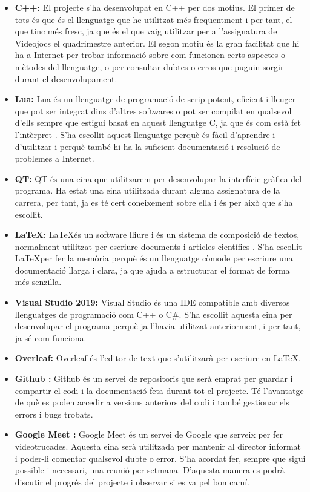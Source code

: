 \documentclass[a4paper]{article}
\begin{document}
\begin{itemize}
    \item \textbf{C++:} El projecte s'ha desenvolupat en C++ per dos motius. El primer de tots és que és el llenguatge que he utilitzat més freqüentment i per tant, el que tinc més fresc, ja que és el que vaig utilitzar per a l'assignatura de Videojocs el quadrimestre anterior. El segon motiu és la gran facilitat que hi ha a Internet per trobar informació sobre com funcionen certs aspectes o mètodes del llenguatge, o per consultar dubtes o erros que puguin sorgir durant el desenvolupament. 
    \item \textbf{Lua:} Lua és un llenguatge de programació de scrip potent, eficient i lleuger que pot ser integrat dins d'altres softwares o pot ser compilat en qualsevol d'ells sempre que estigui basat en aquest llenguatge C, ja que és com està fet l'intèrpret \cite{luaAbout}. S'ha escollit aquest llenguatge perquè és fàcil d'aprendre i d'utilitzar i perquè també hi ha la suficient documentació i resolució de problemes a Internet.
    \item \textbf{QT:} QT és una eina que utilitzarem per desenvolupar la interfície gràfica del programa. Ha estat una eina utilitzada durant alguna assignatura de la carrera, per tant, ja es té cert coneixement sobre ella i és per això que s'ha escollit. 
    \item \textbf{\LaTeX:} \LaTeX és un software lliure i és un sistema de composició de textos, normalment utilitzat per escriure documents i articles científics \cite{wikipediaLatex}. S'ha escollit \LaTeX per fer la memòria perquè és un llenguatge còmode per escriure una documentació llarga i clara, ja que ajuda a estructurar el format de forma més senzilla.
    \item \textbf{Visual Studio 2019:} Visual Studio és una IDE compatible amb diversos llenguatges de programació com C++ o C\#. S'ha escollit aquesta eina per desenvolupar el programa perquè ja l'havia utilitzat anteriorment, i per tant, ja sé com funciona.  
    \item \textbf{Overleaf:} Overleaf és l'editor de text que s'utilitzarà per escriure en \LaTeX.
    \item \textbf{Github \cite{Github}:} Github és un servei de repositoris que serà emprat per guardar i compartir el codi i la documentació feta durant tot el projecte. Té l'avantatge de què es poden accedir a versions anteriors del codi i també gestionar els errors i bugs trobats. 
    \item \textbf{Google Meet \cite{GoogleMeet}:} Google Meet és un servei de Google que serveix per fer videotrucades. Aquesta eina serà utilitzada per mantenir al director informat i poder-li comentar qualsevol dubte o error. S'ha acordat fer, sempre que sigui possible i necessari, una reunió per setmana. D'aquesta manera es podrà discutir el progrés del projecte i observar si es va pel bon camí.
    
\end{itemize}
\end{document}
